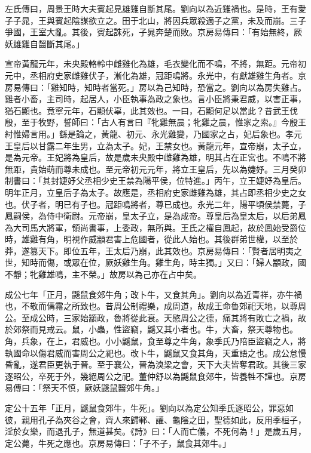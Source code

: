 \begin{pinyinscope}
左氏傳曰，周景王時大夫賓起見雄雞自斷其尾。劉向以為近雞禍也。是時，王有愛子子晁，王與賓起陰謀欲立之。田于北山，將因兵眾殺適子之黨，未及而崩。三子爭國，王室大亂。其後，賓起誅死，子晁奔楚而敗。京房易傳曰：「有始無終，厥妖雄雞自齧斷其尾。」

宣帝黃龍元年，未央殿輅軨中雌雞化為雄，毛衣變化而不鳴，不將，無距。元帝初元中，丞相府史家雌雞伏子，漸化為雄，冠距鳴將。永光中，有獻雄雞生角者。京房易傳曰：「雞知時，知時者當死。」房以為己知時，恐當之。劉向以為房失雞占。雞者小畜，主司時，起居人，小臣執事為政之象也。言小臣將秉君威，以害正事，猶石顯也。竟寧元年，石顯伏辜，此其效也。一曰，石顯何足以當此？昔武王伐殷，至于牧野，誓師曰：「古人有言曰『牝雞無晨；牝雞之晨，惟家之索。』今殷王紂惟婦言用。」繇是論之，黃龍、初元、永光雞變，乃國家之占，妃后象也。孝元王皇后以甘露二年生男，立為太子。妃，王禁女也。黃龍元年，宣帝崩，太子立，是為元帝。王妃將為皇后，故是歲未央殿中雌雞為雄，明其占在正宮也。不鳴不將無距，貴始萌而尊未成也。至元帝初元元年，將立王皇后，先以為婕妤。三月癸卯制書曰：「其封婕妤父丞相少史王禁為陽平侯，位特進。」丙午，立王婕妤為皇后。明年正月，立皇后子為太子。故應是，丞相府史家雌雞為雄，其占即丞相少史之女也。伏子者，明已有子也。冠距鳴將者，尊已成也。永光二年，陽平頃侯禁薨，子鳳嗣侯，為侍中衛尉。元帝崩，皇太子立，是為成帝。尊皇后為皇太后，以后弟鳳為大司馬大將軍，領尚書事，上委政，無所與。王氏之權自鳳起，故於鳳始受爵位時，雄雞有角，明視作威顓君害上危國者，從此人始也。其後群弟世權，以至於莽，遂篡天下。即位五年，王太后乃崩，此其效也。京房易傳曰：「賢者居明夷之世，知時而傷，或眾在位，厥妖雞生角。雞生角，時主獨。」又曰：「婦人顓政，國不靜；牝雞雄鳴，主不榮。」故房以為己亦在占中矣。

成公七年「正月，鼷鼠食郊牛角；改卜牛，又食其角」。劉向以為近青祥，亦牛禍也，不敬而傋霿之所致也。昔周公制禮樂，成周道，故成王命魯郊祀天地，以尊周公。至成公時，三家始顓政，魯將從此衰。天愍周公之德，痛其將有敗亡之禍，故於郊祭而見戒云。鼠，小蟲，性盜竊，鼷又其小者也。牛，大畜，祭天尊物也。角，兵象，在上，君威也。小小鼷鼠，食至尊之牛角，象季氏乃陪臣盜竊之人，將執國命以傷君威而害周公之祀也。改卜牛，鼷鼠又食其角，天重語之也。成公怠慢昏亂，遂君臣更執于晉。至于襄公，晉為溴梁之會，天下大夫皆奪君政。其後三家逐昭公，卒死于外，幾絕周公之祀。董仲舒以為鼷鼠食郊牛，皆養牲不謹也。京房易傳曰：「祭天不慎，厥妖鼷鼠齧郊牛角。」

定公十五年「正月，鼷鼠食郊牛，牛死」。劉向以為定公知季氏逐昭公，罪惡如彼，親用孔子為夾谷之會，齊人來歸鄆、讙、龜陰之田，聖德如此，反用季桓子，淫於女樂，而退孔子，無道甚矣。《詩》曰：「人而亡儀，不死何為！」是歲五月，定公薨，牛死之應也。京房易傳曰：「子不子，鼠食其郊牛。」


\end{pinyinscope}
